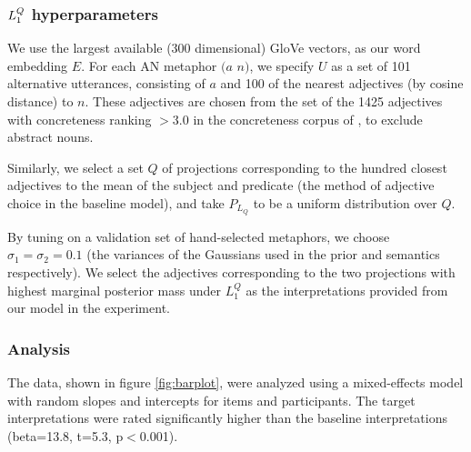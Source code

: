 \documentclass[OpenMind]{stjour}
\newcommand{\Listener}{L}
\newcommand{\QLONE}{\Listener_{{1}}^{{Q}}}
\begin{document}



	\subsubsection{$\protect\QLONE$ hyperparameters}

		We use the largest available (300 dimensional) GloVe vectors, as our word embedding $E$. For each AN metaphor $(a$ $n)$, we specify $U$ as a set of 101 alternative utterances, consisting of $a$ and 100 of the nearest adjectives (by cosine distance) to $n$. These adjectives are chosen from the set of the 1425 adjectives with concreteness ranking $>3.0$ in the concreteness corpus of \citep{brysbaert2014concreteness}, to exclude abstract nouns.

		Similarly, we select a set $Q$ of projections corresponding to the hundred closest adjectives to the mean of the subject and predicate (the method of adjective choice in the baseline model), and take $P_{L_Q}$ to be a uniform distribution over $Q$. 

		By tuning on a validation set of hand-selected metaphors, we choose $\sigma_1=\sigma_2=0.1$ (the variances of the Gaussians used in the prior and semantics respectively). We select the adjectives corresponding to the two projections with highest marginal posterior mass under $\QLONE$ as the interpretations provided from our model in the experiment.

	\subsubsection{Analysis}

		The data, shown in figure \ref{fig:barplot}, were analyzed using a mixed-effects model with random slopes and intercepts for items and participants. The target interpretations were rated significantly higher than the baseline interpretations (beta=13.8, t=5.3, p$<$0.001).


		

\end{document}
